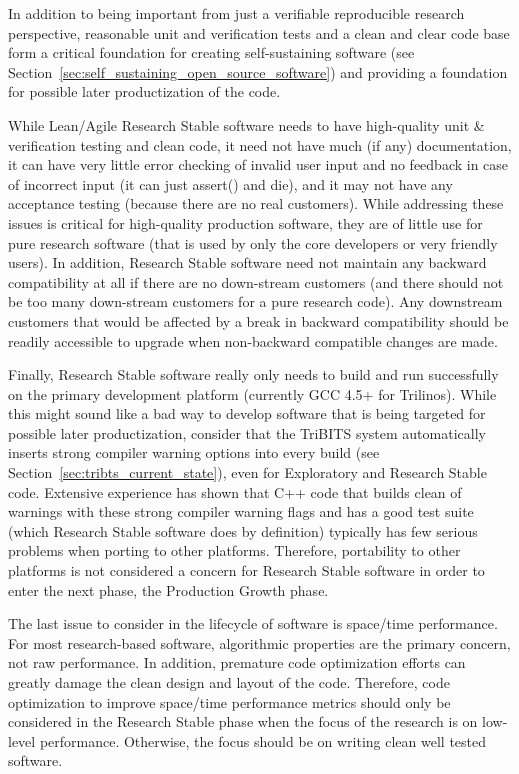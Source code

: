 \documentclass[11pt]{SANDreport}
\begin{document}
In addition to being important from just a verifiable reproducible research perspective, reasonable unit and verification tests and a clean and clear code base form a critical foundation for creating self-sustaining software (see Section~\ref{sec:self_sustaining_open_source_software}) and providing a foundation for possible later productization of the code.

While Lean/Agile Research Stable software needs to have high-quality unit \& verification testing and clean code, it need not have much (if any) documentation, it can have very little error checking of invalid user input and no feedback in case of incorrect input (it can just assert() and die), and it may not have any acceptance testing (because there are no real customers).  While addressing these issues is critical for high-quality production software, they are of little use for pure research software (that is used by only the core developers or very friendly users).  In addition, Research Stable software need not maintain any backward compatibility at all if there are no down-stream customers (and there should not be too many down-stream customers for a pure research code).  Any downstream customers that would be affected by a break in backward compatibility should be readily accessible to upgrade when non-backward compatible changes are made.

Finally, Research Stable software really only needs to build and run successfully on the primary development platform (currently GCC 4.5+ for Trilinos).  While this might sound like a bad way to develop software that is being targeted for possible later productization, consider that the TriBITS system automatically inserts strong compiler warning options into every build (see Section~\ref{sec:tribts_current_state}), even for Exploratory and Research Stable code.  Extensive experience has shown that C++ code that builds clean of warnings with these strong compiler warning flags and has a good test suite (which Research Stable software does by definition) typically has few serious problems when porting to other platforms.  Therefore, portability to other platforms is not considered a concern for Research Stable software in order to enter the next phase, the Production Growth phase.

The last issue to consider in the lifecycle of software is space/time performance.  For most research-based software, algorithmic properties are the primary concern, not raw performance.  In addition, premature code optimization efforts can greatly damage the clean design and layout of the code.  Therefore, code optimization to improve space/time performance metrics should only be considered in the Research Stable phase when the focus of the research is on low-level performance.  Otherwise, the focus should be on writing clean well tested software.
\end{document}
